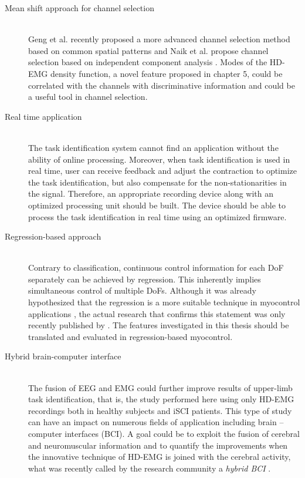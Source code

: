 \begin{description}
\item[Mean shift approach for channel selection] \hfill \\
	Geng et al. recently proposed a more advanced channel selection method based on common spatial patterns \citep{Geng2014} and Naik et al. propose channel selection based on independent component analysis \citep{Naik2016}. Modes of the HD-EMG density function, a novel feature proposed in chapter 5, could be correlated with the channels with discriminative information and could be a useful tool in channel selection.

\item[Real time application] \hfill \\
	The task identification system cannot find an application without the ability of online processing. Moreover, when task identification is used in real time, user can receive feedback and adjust the contraction to optimize the task identification, but also compensate for the non-stationarities in the signal. Therefore, an appropriate recording device along with an optimized processing unit should be built. The device should be able to process the task identification in real time using an optimized firmware.
	
\item[Regression-based approach] \hfill \\
	Contrary to classification, continuous control information for each DoF separately can be achieved by regression. This inherently implies simultaneous control of multiple DoFs. Although it was already hypothesized that the regression is a more suitable technique in myocontrol applications \citep{Jiang2012}, the actual research that confirms this statement was only recently published by \citet{Hahne2017}. The features investigated in this thesis should be translated and evaluated in regression-based myocontrol. 

\item[Hybrid brain-computer interface] \hfill \\
	The fusion of EEG and EMG could further improve results of upper-limb task identification, that is, the study performed here using only HD-EMG recordings both in healthy subjects and iSCI patients. This type of study can have an impact on numerous fields of application including brain – computer interfaces (BCI). A goal could be to exploit the fusion of cerebral and neuromuscular information and to quantify the improvements when the innovative technique of HD-EMG is joined with the cerebral activity, what was recently called by the research community a \emph{hybrid BCI} \citep{Muller-Putz2015, Rohm2013}.


\end{description}
